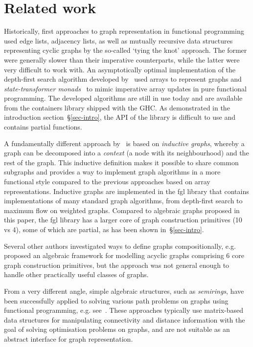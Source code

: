 \section{Related work}\label{sec-related}

Historically, first approaches to graph representation in functional programming
used edge lists, adjacency lists, as well as mutually recursive data structures
representing cyclic graphs by the so-called `tying the knot' approach. The former
were generally slower
than their imperative counterparts, while the latter were very difficult to
work with. An asymptotically optimal implementation of the depth-first search
algorithm developed by~\citet{1995_king_graphs} used arrays to represent graphs
and \emph{state-transformer monads}~\cite{1994_launchbury_st} to mimic imperative array
updates in pure functional programming. The developed algorithms are still in
use today and are available from the \textsf{containers} library shipped with the GHC.
As demonstrated in the introduction section~\S\ref{sec-intro}, the API of
the library is difficult to use and contains partial functions.

A fundamentally different approach by~\citet{2001_erwig_inductive} is based
on \emph{inductive graphs}, whereby a graph can be decomposed into a \emph{context}
(a node with its neighbourhood) and the rest of the graph. This inductive
definition makes it possible to share common subgraphs and provides a way to
implement graph algorithms in a more functional style compared to the previous
approaches based on array representations. Inductive graphs are implemented in
the \textsf{fgl} library that contains implementations of many standard graph
algorithms, from depth-first search to maximum flow on weighted graphs. Compared
to algebraic graphs proposed in this paper, the \textsf{fgl} library has a larger
core of graph construction primitives (10 vs 4), some of which are partial, as
has been shown in~\S\ref{sec-intro}.

Several other authors investigated ways to define graphs compositionally,
e.g.~\citet{1995_gibbons_algebra} proposed an algebraic framework for modelling
acyclic graphs comprising 6 core graph construction primitives, but the approach
was not general enough to handle other practically useful classes of graphs.

From a very different angle, simple algebraic structures, such as \emph{semirings},
have been successfully applied to solving various path problems on graphs using
functional programming, e.g. see~\citet{2013_semirings_dolan}. These approaches
typically use matrix-based data structures for manipulating connectivity and distance
information with the goal of solving optimisation problems on graphs, and are not
suitable as an abstract interface for graph representation.

